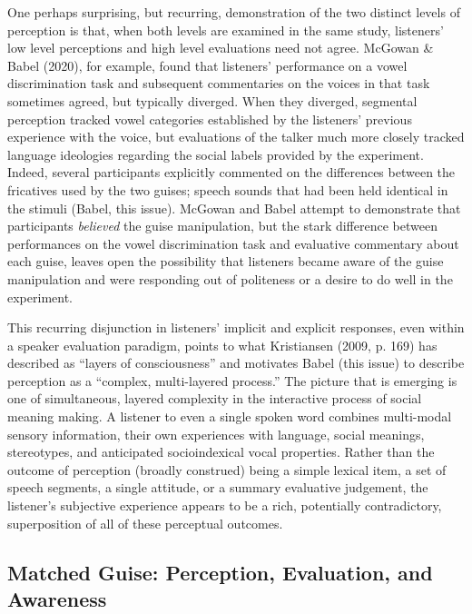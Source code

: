 \documentclass[
  letterpaper,
  DIV=11,
  numbers=noendperiod]{scrartcl}
\begin{document}
One perhaps surprising, but recurring, demonstration of the two distinct
levels of perception is that, when both levels are examined in the same
study, listeners' low level perceptions and high level evaluations need
not agree. McGowan \& Babel (2020), for example, found that listeners'
performance on a vowel discrimination task and subsequent commentaries
on the voices in that task sometimes agreed, but typically diverged.
When they diverged, segmental perception tracked vowel categories
established by the listeners' previous experience with the voice, but
evaluations of the talker much more closely tracked language ideologies
regarding the social labels provided by the experiment. Indeed, several
participants explicitly commented on the differences between the
fricatives used by the two guises; speech sounds that had been held
identical in the stimuli (Babel, this issue). McGowan and Babel attempt
to demonstrate that participants \emph{believed} the guise manipulation,
but the stark difference between performances on the vowel
discrimination task and evaluative commentary about each guise, leaves
open the possibility that listeners became aware of the guise
manipulation and were responding out of politeness or a desire to do
well in the experiment.

This recurring disjunction in listeners' implicit and explicit
responses, even within a speaker evaluation paradigm, points to what
Kristiansen (2009, p. 169) has described as ``layers of consciousness''
and motivates Babel (this issue) to describe perception as a ``complex,
multi-layered process.'' The picture that is emerging is one of
simultaneous, layered complexity in the interactive process of social
meaning making. A listener to even a single spoken word combines
multi-modal sensory information, their own experiences with language,
social meanings, stereotypes, and anticipated socioindexical vocal
properties. Rather than the outcome of perception (broadly construed)
being a simple lexical item, a set of speech segments, a single
attitude, or a summary evaluative judgement, the listener's subjective
experience appears to be a rich, potentially contradictory,
superposition of all of these perceptual outcomes.

\subsection{Matched Guise: Perception, Evaluation, and
Awareness}\label{sec-mgt}
\end{document}
